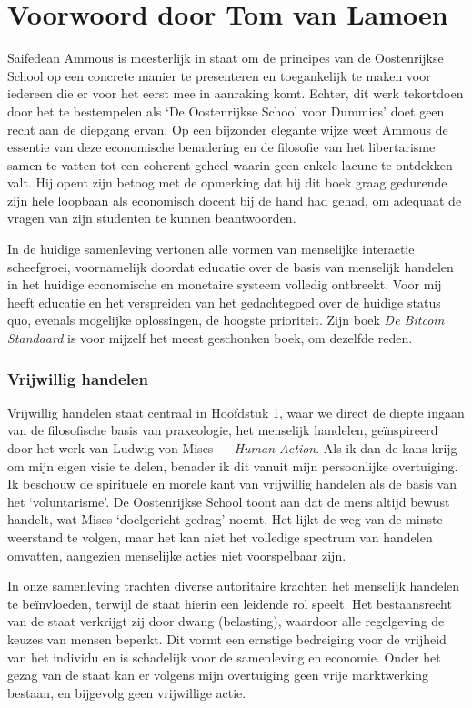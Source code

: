 \chapter{Voorwoord door Tom van Lamoen}

Saifedean Ammous is meesterlijk in staat om de principes van de Oostenrijkse School op een concrete manier te presenteren en toegankelijk te maken voor iedereen die er voor het eerst mee in aanraking komt. Echter, dit werk tekortdoen door het te bestempelen als `De Oostenrijkse School voor Dummies' doet geen recht aan de diepgang ervan. Op een bijzonder elegante wijze weet Ammous de essentie van deze economische benadering en de filosofie van het libertarisme samen te vatten tot een coherent geheel waarin geen enkele lacune te ontdekken valt. Hij opent zijn betoog met de opmerking dat hij dit boek graag gedurende zijn hele loopbaan als economisch docent bij de hand had gehad, om adequaat de vragen van zijn studenten te kunnen beantwoorden.

In de huidige samenleving vertonen alle vormen van menselijke interactie scheefgroei, voornamelijk doordat educatie over de basis van menselijk handelen in het huidige economische en monetaire systeem volledig ontbreekt. Voor mij heeft educatie en het verspreiden van het gedachtegoed over de huidige status quo, evenals mogelijke oplossingen, de hoogste prioriteit. Zijn boek \emph{De Bitcoin Standaard} is voor mijzelf het meest geschonken boek, om dezelfde reden.

\subsection{Vrijwillig handelen}

Vrijwillig handelen staat centraal in Hoofdstuk 1, waar we direct de diepte ingaan van de filosofische basis van praxeologie, het menselijk handelen, geïnspireerd door het werk van Ludwig von Mises --- \emph{Human Action}. Als ik dan de kans krijg om mijn eigen visie te delen, benader ik dit vanuit mijn persoonlijke overtuiging. Ik beschouw de spirituele en morele kant van vrijwillig handelen als de basis van het `voluntarisme'. De Oostenrijkse School toont aan dat de mens altijd bewust handelt, wat Mises `doelgericht gedrag' noemt. Het lijkt de weg van de minste weerstand te volgen, maar het kan niet het volledige spectrum van handelen omvatten, aangezien menselijke acties niet voorspelbaar zijn.

In onze samenleving trachten diverse autoritaire krachten het menselijk handelen te beïnvloeden, terwijl de staat hierin een leidende rol speelt. Het bestaansrecht van de staat verkrijgt zij door dwang (belasting), waardoor alle regelgeving de keuzes van mensen beperkt. Dit vormt een ernstige bedreiging voor de vrijheid van het individu en is schadelijk voor de samenleving en economie. Onder het gezag van de staat kan er volgens mijn overtuiging geen vrije marktwerking bestaan, en bijgevolg geen vrijwillige actie.

